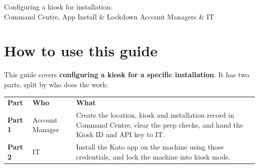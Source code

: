 \documentclass[a4paper,10pt]{article}
\begin{document}
             {Configuring a kiosk for installation: \\Command Centre, App Install \& Lockdown}
             {Account Managers \& IT}

\section*{How to use this guide}

This guide covers \textbf{configuring a kiosk for a specific
installation}. It has two parts, split by who does the work:

\begin{center}
\renewcommand{\arraystretch}{1.35}\small
\begin{tabularx}{\textwidth}{L{20mm} L{34mm} X}
\color{white}\textbf{Part} &
\color{white}\textbf{Who} & \color{white}\textbf{What}\\
\textbf{Part 1} & Account Manager &
Create the location, kiosk and installation record in Command Centre,
clear the prep checks, and hand the Kiosk ID and API key to IT.\\
\textbf{Part 2} & IT &
Install the Kato app on the machine using those credentials, and lock the
machine into kiosk mode.\\
\end{tabularx}
\end{center}
\end{document}

